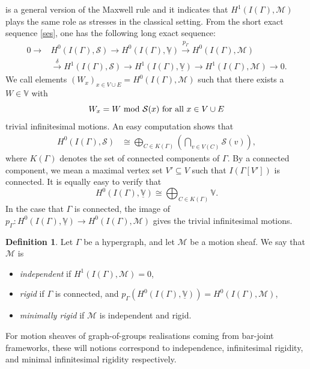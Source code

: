 \documentclass{article}
\theoremstyle{definition}
\newtheorem{definition}[theorem]{Definition}
\theoremstyle{remark}
\begin{document}
 is a general version of the Maxwell rule and it indicates that $H^{1}(I(\Gamma), \mathcal{M})$ plays the same role as stresses in the classical setting. From the short exact sequence \eqref{ses}, one has the following long exact sequence:
\begin{equation}\label{les}
    \begin{array}{cl}
    0 \rightarrow & H^0(I(\Gamma), \mathcal{S}) \rightarrow H^0(I(\Gamma), \underline{\mathbb{V}}) \xrightarrow{p_{\Gamma}} H^0(I(\Gamma), \mathcal{M}) \\[10pt]
    &\xrightarrow{\delta} H^1(I(\Gamma), \mathcal{S}) \rightarrow H^1(I(\Gamma), \underline{\mathbb{V}}) \rightarrow H^1(I(\Gamma), \mathcal{M}) \rightarrow 0.
\end{array}
\end{equation}
We call elements $(W_{x})_{x\in V\cup E} = H^{0}(I(\Gamma), \mathcal{M})$ such that there exists a $W\in \mathbb{V}$ with
\begin{equation*}
    W_x = W \textup{ mod } \mathcal{S}(x) \textup{ for all } x\in V\cup E
\end{equation*}
trivial infinitesimal motions. An easy computation shows that 
\begin{align*}
    H^{0}(I(\Gamma), \mathcal{S}) & \cong \bigoplus_{ C \in K(\Gamma) } \left(\bigcap_{v \in V(C)} \mathcal{S}(v)\right),
\end{align*}
where $K(\Gamma)$ denotes the set of connected components of $\Gamma$. By a connected component, we mean a maximal vertex set $V'\subseteq V$ such that $I(\Gamma[V'])$ is connected. It is equally easy to verify that 
\begin{equation*}
   H^{0}(I(\Gamma), \underline{\mathbb{V}}) \cong \bigoplus_{ C \in K(\Gamma) } \mathbb{V}.
\end{equation*}
In the case that $\Gamma$ is connected, the image of $p_{\Gamma}: H^0(I(\Gamma), \underline{\mathbb{V}}) \rightarrow H^0(I(\Gamma), \mathcal{M})$ gives the trivial infinitesimal motions.

\begin{definition}
    Let $\Gamma$ be a hypergraph, and let $\mathcal{M}$ be a motion sheaf. We say that $\mathcal{M}$ is 
    \begin{itemize}
        \item \textit{independent} if $H^{1}(I(\Gamma), \mathcal{M}) = 0$,
        \item \textit{rigid} if $\Gamma$ is connected, and $p_{\Gamma}(H^{0}(I(\Gamma), \underline{\mathbb{V}})) = H^{0}(I(\Gamma), \mathcal{M})$,
        \item \textit{minimally rigid} if $\mathcal{M}$ is independent and rigid.
    \end{itemize}
\end{definition}
For motion sheaves of graph-of-groups realisations coming from bar-joint frameworks, these will notions correspond to independence, infinitesimal rigidity, and minimal infinitesimal rigidity respectively. 
\end{document}
